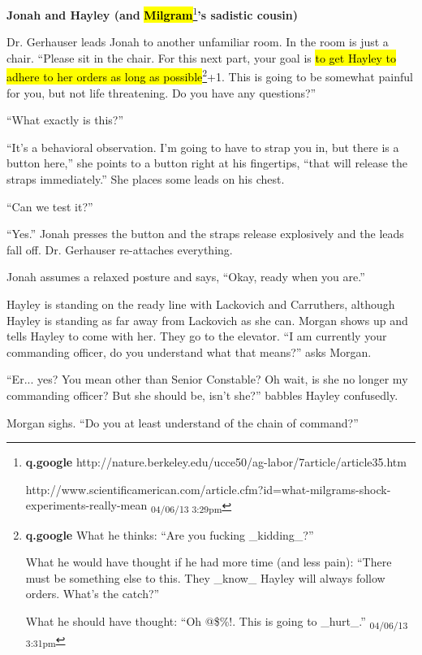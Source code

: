 \textbf{Jonah and Hayley (and }\textbf{\hl{Milgram}}\footnote{\textbf{q.google }http://nature.berkeley.edu/ucce50/ag-labor/7article/article35.htm

http://www.scientificamerican.com/article.cfm?id=what-milgrams-shock-experiments-really-mean \textsubscript{04/06/13 3:29pm}}\textbf{'s sadistic cousin)}



Dr. Gerhauser leads Jonah to another unfamiliar room.  In the room is just a chair.  ``Please sit in the chair.  For this next part, your goal is \hl{to get Hayley to adhere to her orders as long as possible}\footnote{\textbf{q.google }What he thinks: ``Are you fucking \_kidding\_?''

What he would have thought if he had more time (and less pain): ``There must be something else to this.  They \_know\_ Hayley will always follow orders.  What's the catch?''

What he should have thought: ``Oh @\$\%!.  This is going to \_hurt\_.'' \textsubscript{04/06/13 3:31pm}}+1.  This is going to be somewhat painful for you, but not life threatening.  Do you have any questions?'' 

``What exactly is this?''

``It's a behavioral observation.  I'm going to have to strap you in, but there is a button here,'' she points to a button right at his fingertips, ``that will release the straps immediately.''  She places some leads on his chest.

``Can we test it?''

``Yes.''  Jonah presses the button and the straps release explosively and the leads fall off.  Dr. Gerhauser re-attaches everything.

Jonah assumes a relaxed posture and says, ``Okay, ready when you are.''



Hayley is standing on the ready line with Lackovich and Carruthers, although Hayley is standing as far away from Lackovich as she can.  Morgan shows up and tells Hayley to come with her. They go to the elevator.  ``I am currently your commanding officer, do you understand what that means?'' asks Morgan.

``Er... yes?  You mean other than Senior Constable?  Oh wait, is she no longer my commanding officer?  But she should be, isn't she?'' babbles Hayley confusedly.

Morgan sighs.  ``Do you at least understand of the chain of command?''

